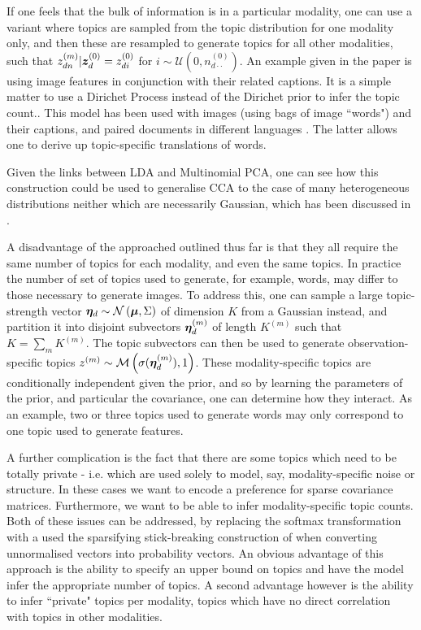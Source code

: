 If one feels that the bulk of information is in a particular modality, one can use a variant\cite{Blei2003} where topics are sampled from the topic distribution for one modality only, and then these are resampled to generate topics for all other modalities, such that $z_{dn}^{(m)}|\bm z_d^{(0)} = z_{di}^{(0)}$ for $i \sim \mathcal{U}(0, n_{d\cdot\cdot}^{(0)})$. An example given in the paper is using image features in conjunction with their related captions. It is a simple matter to use a Dirichet Process instead of the Dirichet prior to infer the topic count.\cite{Yakhnenko2009}. This model has been used with images (using bags of image ``words") and their captions\cite{Blei2003}, and paired documents in different languages \cite{Zhao2001}. The latter allows one to derive up topic-specific translations of words.

Given the links between LDA and Multinomial PCA\cite{Buntine2002}, one can see how this construction could be used to generalise CCA to the case of many heterogeneous distributions neither which are necessarily Gaussian, which has been discussed in \cite{Virtanen2012a}. 

A disadvantage of the approached outlined thus far is that they all require the same number of topics for each modality, and even the same topics. In practice the number of set of topics used to generate, for example, words, may differ to those necessary to generate images. To address this\cite{Salomatin2009}, one can sample a large topic-strength vector $\bm \eta_d \sim \mathcal{N} \left( {\bm \mu}, {\Sigma} \right)$ of dimension $K$ from a Gaussian instead, and partition it into disjoint subvectors $\bm \eta_d^{(m)}$ of length $K^{(m)}$ such that $K = \sum_m K^{(m)}$. The topic subvectors can then be used to generate observation-specific topics $z^{(m)} \sim \mathcal{M} \left( {\sigma(\bm \eta_d^{(m)})},{1} \right)$. These modality-specific topics are conditionally independent given the prior, and so by learning the parameters of the prior, and particular the covariance, one can determine how they interact. As an example, two or three topics used to generate words may only correspond to one topic used to generate features.

A further complication is the fact that there are some topics which need to be totally private - i.e. which are used solely to model, say, modality-specific noise or structure. In these cases we want to encode a preference for sparse covariance matrices. Furthermore, we want to be able to infer modality-specific topic counts. Both of these issues can be addressed, by replacing\cite{Virtanen2012a} the softmax transformation with a used the sparsifying stick-breaking construction of \cite{Paisley2012} when converting unnormalised vectors into probability vectors. An obvious advantage of this approach is the ability to specify an upper bound on topics and have the model infer the appropriate number of topics. A second advantage however is the ability to infer ``private" topics per modality, topics which have no direct correlation with topics in other modalities.

